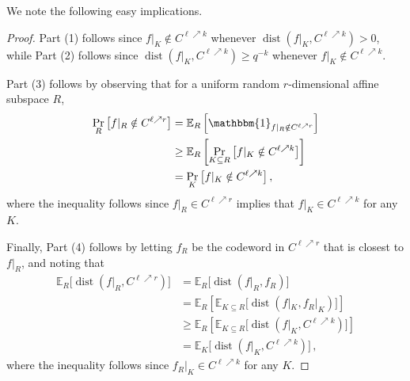 \documentclass{toc}
\theoremstyle{plain}
\DeclareMathOperator{\dist}{dist} %
\newcommand{\E}{{\mathbb{E}}}
\newcommand{\F}{{\mathbb{F}}}
\newcommand{\Func}[1]{\{\F_q^{#1} \to \F_q\}}
\begin{document}
We note the following easy implications.

\begin{proof}
Part (1) follows since $f|_K \notin C^{\ell \nearrow k}$ whenever $\dist(f|_K, C^{\ell \nearrow k})>0$, while Part (2) follows since $\dist(f|_K, C^{\ell \nearrow k}) \geq q^{-k}$ whenever $f|_K \notin C^{\ell \nearrow k}$.

Part (3) follows by observing that for a uniform random $r$-dimensional affine subspace $R$,
\begin{align*}
\Pr_R\big[f|_R \notin C^{\ell \nearrow r}\big] & =  \E_R\left[\mathbbm{1}_{f|_R \notin C^{\ell \nearrow r}}\right] \\
 & \geq  \E_R \left[  \Pr_{K\subseteq R} \big[  f|_K \notin C^{\ell \nearrow k} \big]\right] \\
 & =  \Pr_K\big[f|_K \notin C^{\ell \nearrow k}\big]\,,
\end{align*}
where the inequality follows since $f|_R \in C^{\ell \nearrow r}$ implies that $ f|_K \in C^{\ell \nearrow k}$ for any $K$.

Finally, Part (4) follows by letting $f_R$ be the codeword in $C^{\ell \nearrow r}$ that is closest to $f|_R$, and noting that
\begin{align*}
  \E_R\big[\dist(f|_R, C^{\ell \nearrow r})\big]
  & =  \E_R\big[\dist(f|_R, f_R)\big] \\
& =  \E_R \left[ \E_{ K \subseteq R}\big[\dist(f|_K, f_R|_K)\big]\right] \\
 & \geq  \E_R \left[ \E_{ K \subseteq R}\big[\dist(f|_K, C^{\ell \nearrow k})\big]\right] \\
 & =  \E_K\big[\dist(f|_K, C^{\ell \nearrow k})\big]\,,
\end{align*}
where the inequality follows since $f_R|_K \in C^{\ell \nearrow k}$ for any $K$.
\end{proof}
\end{document}
